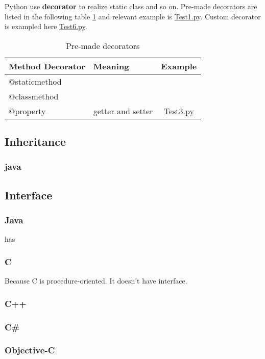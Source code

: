 \documentclass[12pt, a4pape]{article}
\begin{document}
		Python use \textbf{decorator} to realize static class and so on. Pre-made decorators are listed in the following table \ref{tab-decorator} and relevant example is \href{https://github.com/muerbingsha/compsumm/blob/master/learn/python/Test1.py}{Test1.py}. Custom decorator is exampled here \href{https://github.com/muerbingsha/compsumm/blob/master/learn/python/Test6.py}{Test6.py}. 
		\begin{table}[H]
		\centering
		\begin{tabular}{|l|l|c|}
		\toprule
		Method Decorator & Meaning & Example \\
		\toprule
		@staticmethod &  & \\
		\hline
		@classmethod & &  \\
		\hline
		@property & getter and setter & \href{https://github.com/muerbingsha/compsumm/blob/master/learn/python/Test3.py}{Test3.py} \\
		\bottomrule
		\end{tabular}
		\caption{Pre-made decorators}
		\label{tab-decorator}
		\end{table}
		
		
	\subsection{Inheritance}
		\subsubsection{java}
	
		
	\subsection{Interface}
		\subsubsection{Java}
		has 
		\subsubsection{C}
		Because C is procedure-oriented. It doesn't have interface.
		\subsubsection{C++}
		\subsubsection{C\#}
		\subsubsection{Objective-C}
\end{document}
